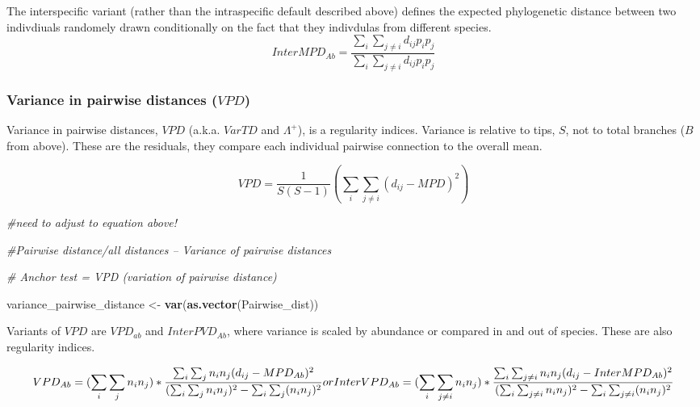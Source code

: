 \documentclass[]{book}
\newenvironment{Shaded}{\begin{snugshade}}{\end{snugshade}}
\newcommand{\KeywordTok}[1]{\textcolor[rgb]{0.13,0.29,0.53}{\textbf{{#1}}}}
\newcommand{\StringTok}[1]{\textcolor[rgb]{0.31,0.60,0.02}{{#1}}}
\newcommand{\CommentTok}[1]{\textcolor[rgb]{0.56,0.35,0.01}{\textit{{#1}}}}
\newcommand{\NormalTok}[1]{{#1}}
\theoremstyle{definition}
\theoremstyle{definition}
\theoremstyle{remark}
\begin{document}
The interspecific variant (rather than the intraspecific default
described above) defines the expected phylogenetic distance between two
indivdiuals randomely drawn conditionally on the fact that they
indivdulas from different species.
\[InterMPD_{Ab} = \dfrac{\sum_{i} \sum_{j \ne i} d_{ij} p_{i} p_{j} }{\sum_{i} \sum_{j \ne i} d_{ij} p_{i} p_{j}}  \]

\subsubsection{\texorpdfstring{Variance in pairwise distances
(\(VPD\))}{Variance in pairwise distances (VPD)}}\label{variance-in-pairwise-distances-vpd}

Variance in pairwise distances, \(VPD\) (a.k.a. \(VarTD\) and
\(\Lambda^+\)), is a regularity indices. \citet{Clarke2001} Variance is
relative to tips, \(S\), not to total branches (\(B\) from above). These
are the residuals, they compare each individual pairwise connection to
the overall mean.

\[VPD = \dfrac{1}{S(S-1)} (\sum_{i} \sum_{j \ne i} {(d_{ij} - MPD)^2})\]

\begin{Shaded}
\begin{Highlighting}[]
\CommentTok{#need to adjust to equation above!}

\CommentTok{#Pairwise distance/all distances -- Variance of pairwise distances}

\CommentTok{# Anchor test = VPD (variation of pairwise distance)  }

\NormalTok{variance_pairwise_distance <-}\StringTok{ }\KeywordTok{var}\NormalTok{(}\KeywordTok{as.vector}\NormalTok{(Pairwise_dist))}
\end{Highlighting}
\end{Shaded}

Variants of \(VPD\) are \(VPD_{ab}\) and \(InterPVD_{Ab}\), where
variance is scaled by abundance or compared in and out of species. These
are also regularity indices.

\[
VPD_{Ab}= 
(\sum_{i} \sum_{j} n_{i} n_{j}) *
\dfrac{\sum_{i} \sum_{j} n_{i} n_{j} (d_{ij} - MPD_{Ab})^2}
{(\sum_{i} \sum_{j} n_{i} n_{j})^2 - \sum_{i} \sum_{j} (n_{i} n_{j})^2}
\\
or
\\
InterVPD_{Ab} = 
(\sum_{i} \sum_{j \ne i} n_{i} n_{j}) *
\dfrac{\sum_{i} \sum_{j \ne i} n_{i} n_{j} (d_{ij} - InterMPD_{Ab})^2}
{(\sum_{i} \sum_{j \ne i} n_{i} n_{j})^2 - \sum_{i} \sum_{j \ne i} (n_{i} n_{j})^2}
\]
\end{document}

